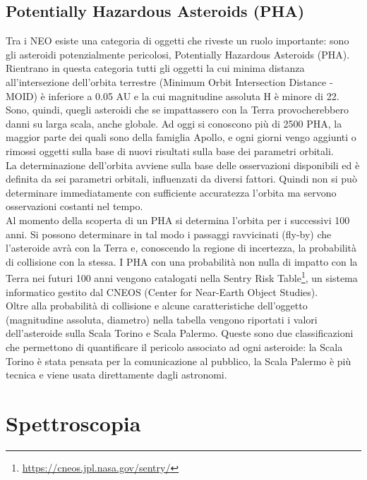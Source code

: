 \documentclass[a4paper,11pt,openright]{book}
\begin{document}
\section{Potentially Hazardous Asteroids (PHA)}
Tra i NEO esiste una categoria di oggetti che riveste un ruolo importante: sono gli asteroidi potenzialmente pericolosi, Potentially Hazardous Asteroids (PHA). Rientrano in questa categoria tutti gli oggetti la cui minima distanza all'intersezione dell'orbita terrestre (Minimum Orbit Intersection Distance - MOID) è inferiore a 0.05 AU e la cui magnitudine assoluta H è minore di 22. Sono, quindi, quegli asteroidi che se impattassero con la Terra provocherebbero danni su larga scala, anche globale. Ad oggi si conoscono più di 2500 PHA, la maggior parte dei quali sono della famiglia Apollo, e ogni giorni vengo aggiunti o rimossi oggetti sulla base di nuovi risultati sulla base dei parametri orbitali.\\
La determinazione dell'orbita avviene sulla base delle osservazioni disponibili ed è definita da sei parametri orbitali, influenzati da diversi fattori. Quindi non si può determinare immediatamente con sufficiente accuratezza l'orbita ma servono osservazioni costanti nel tempo.\\
Al momento della scoperta di un PHA si determina l'orbita per i successivi 100 anni. Si possono determinare in tal modo i passaggi ravvicinati (fly-by) che l'asteroide avrà con la Terra e, conoscendo la regione di incertezza, la probabilità di collisione con la stessa.
I PHA con una probabilità non nulla di impatto con la Terra nei futuri 100 anni vengono catalogati nella Sentry Risk Table\footnote{\href {https://cneos.jpl.nasa.gov/sentry/}{https://cneos.jpl.nasa.gov/sentry/} }, un sistema informatico gestito dal CNEOS (Center for Near-Earth Object Studies).\\
Oltre alla probabilità di collisione e alcune caratteristiche dell’oggetto (magnitudine assoluta, diametro) nella tabella vengono riportati i valori dell’asteroide sulla Scala Torino e Scala Palermo. Queste sono due classificazioni che permettono di quantificare il pericolo associato ad ogni asteroide: la Scala Torino è stata pensata per la comunicazione al pubblico, la Scala Palermo è più tecnica e viene usata direttamente dagli astronomi.

\chapter{Spettroscopia}
\end{document}

